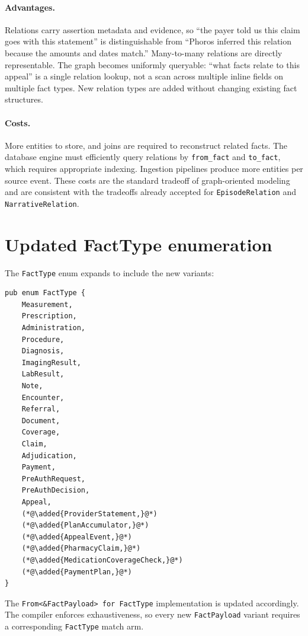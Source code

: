 \documentclass[11pt]{article}
\newcommand{\added}[1]{\textcolor{accentblue}{#1}}
\begin{document}
\paragraph{Advantages.}
Relations carry assertion metadata and evidence, so ``the payer told us this
claim goes with this statement'' is distinguishable from ``Phoros inferred
this relation because the amounts and dates match.'' Many-to-many relations
are directly representable. The graph
becomes uniformly queryable: ``what facts relate to this appeal''
is a single relation lookup, not a scan across multiple inline fields
on multiple fact types. New relation types are added without changing
existing fact structures.

\paragraph{Costs.}
More entities to store, and joins are required to reconstruct related
facts. The database engine must efficiently query relations by
\texttt{from\_fact} and \texttt{to\_fact}, which requires appropriate
indexing. Ingestion pipelines produce more entities per source event.
These costs are the standard tradeoff of graph-oriented modeling and
are consistent with the tradeoffs already accepted for
\texttt{EpisodeRelation} and \texttt{NarrativeRelation}.

\section{Updated FactType enumeration}

The \texttt{FactType} enum expands to include the new variants:

\begin{lstlisting}
pub enum FactType {
    Measurement,
    Prescription,
    Administration,
    Procedure,
    Diagnosis,
    ImagingResult,
    LabResult,
    Note,
    Encounter,
    Referral,
    Document,
    Coverage,
    Claim,
    Adjudication,
    Payment,
    PreAuthRequest,
    PreAuthDecision,
    Appeal,
    (*@\added{ProviderStatement,}@*)
    (*@\added{PlanAccumulator,}@*)
    (*@\added{AppealEvent,}@*)
    (*@\added{PharmacyClaim,}@*)
    (*@\added{MedicationCoverageCheck,}@*)
    (*@\added{PaymentPlan,}@*)
}
\end{lstlisting}

The \texttt{From<\&FactPayload> for FactType} implementation is updated
accordingly. The compiler enforces exhaustiveness, so every new
\texttt{FactPayload} variant requires a corresponding
\texttt{FactType} match arm.
\end{document}
